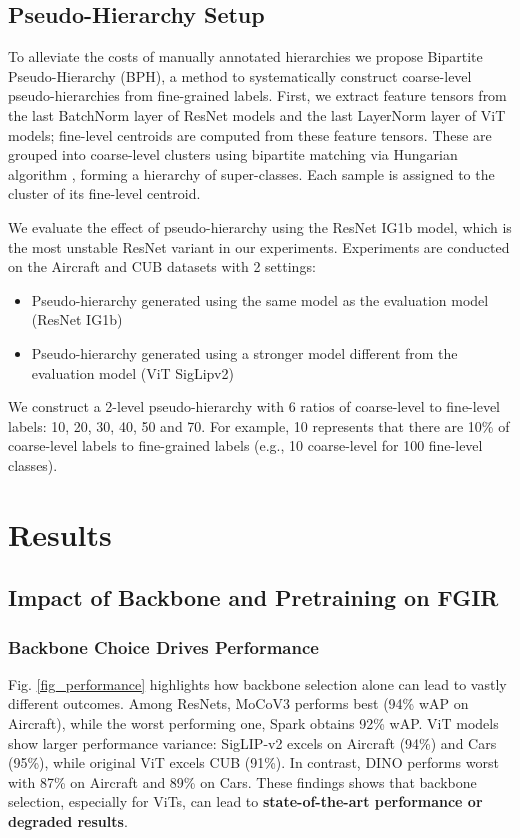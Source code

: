 \documentclass[conference]{IEEEtran}
\begin{document}
\subsection{Pseudo-Hierarchy Setup}
To alleviate the costs of manually annotated hierarchies we propose Bipartite Pseudo-Hierarchy (BPH), a method to systematically construct coarse-level pseudo-hierarchies from fine-grained labels. First, we extract feature tensors from the last BatchNorm layer of ResNet models and the last LayerNorm layer of ViT models; fine-level centroids are computed from these feature tensors. These are grouped into coarse-level clusters using bipartite matching via Hungarian algorithm \cite{kuhn_hungarian_1955}, forming a hierarchy of super-classes. Each sample is assigned to the cluster of its fine-level centroid. 

We evaluate the effect of pseudo-hierarchy using the ResNet IG1b \cite{yalniz_billion-scale_2019} model, which is the most unstable ResNet variant in our experiments. Experiments are conducted on the Aircraft and CUB datasets with 2 settings:

\begin{itemize} [topsep=3pt, itemsep=2pt, parsep=1pt]
    \item Pseudo-hierarchy generated using the same model as the evaluation model (ResNet IG1b)
    \item Pseudo-hierarchy generated using a stronger model different from the evaluation model (ViT SigLipv2)
\end{itemize}

We construct a 2-level pseudo-hierarchy with 6 ratios of coarse-level to fine-level labels: 10, 20, 30, 40, 50 and 70. For example, 10 represents that there are 10\% of coarse-level labels to fine-grained labels (e.g., 10 coarse-level for 100 fine-level classes).

\section{Results}
\subsection{Impact of Backbone and Pretraining on FGIR}
\subsubsection{Backbone Choice Drives Performance}
Fig. \ref{fig_performance} highlights how backbone selection alone can lead to vastly different outcomes. Among ResNets, MoCoV3 performs best (94\% wAP on Aircraft), while the worst performing one, Spark obtains 92\% wAP. ViT models show larger performance variance: SigLIP-v2 excels on Aircraft (94\%) and Cars (95\%), while original ViT excels CUB (91\%). In contrast, DINO performs worst with 87\% on Aircraft and 89\% on Cars. These findings shows that backbone selection, especially for ViTs, can lead to \textbf{state-of-the-art performance or degraded results}.
\end{document}
